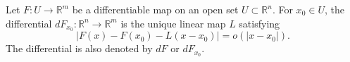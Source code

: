 Let $F: U \to \mathbb{R}^m$ be a differentiable map on an open set $U \subset \mathbb{R}^n$. For $x_0 \in U$, the differential $dF_{x_0}: \mathbb{R}^n \to \mathbb{R}^m$ is the unique linear map $L$ satisfying
$$|F(x) - F(x_0) - L(x - x_0)| = o(|x - x_0|).$$
The differential is also denoted by $dF$ or $dF_{x_0}$.